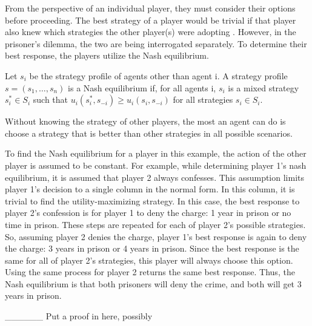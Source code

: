From the perspective of an individual player, they must consider their options before proceeding. The best strategy of a player would be trivial if that player also knew which strategies the other player(s) were adopting \cite{shoh09}. However, in the prisoner's dilemma, the two are being interrogated separately. To determine their best response, the players utilize the Nash equilibrium.

\begin{define}
  Let $s_i$ be the strategy profile of agents other than agent i. A strategy profile $s=(s_1,\dots ,s_n)$ is a Nash equilibrium if, for all agents i, $s_i$ is a mixed strategy $s^*_i\in S_i$ such that $u_i(s^*_i, s_{-i}) \ge u_i(s_i, s_{-i})$ for all strategies $s_i\in S_i$.
\end{define}

Without knowing the strategy of other players, the most an agent can do is choose a strategy that is better than other strategies in all possible scenarios. 

To find the Nash equilibrium for a player in this example, the action of the other player is assumed to be constant. For example, while determining player 1's nash equilibrium, it is assumed that player 2 always confesses. This assumption limits player 1's decision to a single column in the normal form. In this column, it is trivial to find the utility-maximizing strategy. In this case, the best response to player 2's confession is for player 1 to deny the charge: 1 year in prison or no time in prison. These steps are repeated for each of player 2's possible strategies. So, assuming player 2 denies the charge, player 1's best response is again to deny the charge: 3 years in prison or 4 years in prison. Since the best response is the same for all of player 2's strategies, this player will always choose this option. Using the same process for player 2 returns the same best response. Thus, the Nash equilibrium is that both prisoners will deny the crime, and both will get 3 years in prison.

\_\_\_\_\_\_ Put a proof in here, possibly

